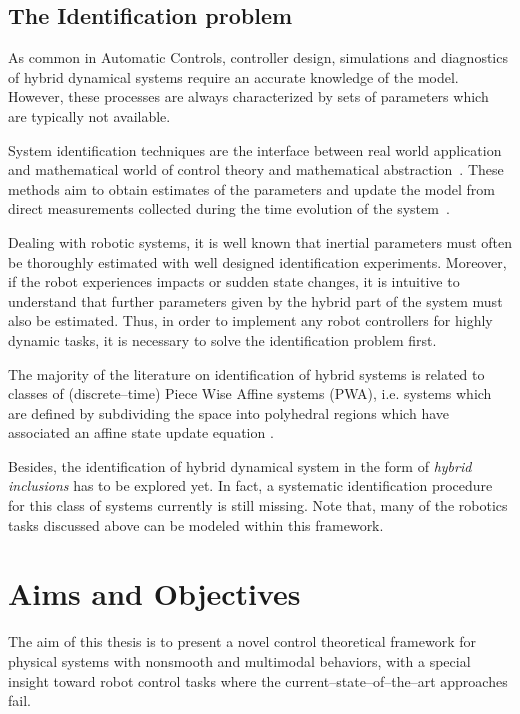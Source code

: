 \subsection{The Identification problem}
%
As common in Automatic Controls, controller design, simulations and diagnostics of hybrid dynamical systems require an accurate knowledge of the model. However, these {processes} are always characterized by sets of parameters which are typically not available.
%
\newline

%
System identification techniques are the interface between real world application and mathematical world of control theory and mathematical abstraction~\cite{LJUNG20101}. These methods aim to obtain estimates of the parameters and update the model from direct measurements collected during the time evolution of the system~\cite{SIS}.
%
\newline

%
Dealing with robotic systems, it is well known that inertial parameters must often be thoroughly estimated with well designed identification experiments. Moreover, if the robot experiences impacts or sudden state changes, it is intuitive to understand that further parameters given by the hybrid part of the system must also be estimated. 
Thus, in order to implement any robot controllers for highly dynamic tasks, it is necessary to solve the identification problem first.
%
\newline

%
The majority of the literature on identification of hybrid systems is related to classes of (discrete--time) Piece Wise Affine systems (PWA), i.e. systems which are defined by subdividing the  space into polyhedral regions which have associated an affine state update equation \cite{Juloski,Paoletti,Bemporad,Ferrari, juloski2005bayesian}.
% 
\newline

%
Besides, the identification of hybrid dynamical system in the form of \textit{hybrid inclusions} has to be explored yet. In fact, a systematic identification procedure for this class of systems currently is still missing. Note that, many of the robotics tasks discussed above can be modeled within this framework.
%

\clearpage

\section{{Aims and Objectives}}\label{sec:aim}
The aim of this thesis is to present a novel control theoretical framework for physical systems with nonsmooth and multimodal behaviors, with a special insight toward robot control tasks where the current--state--of--the--art approaches fail.

